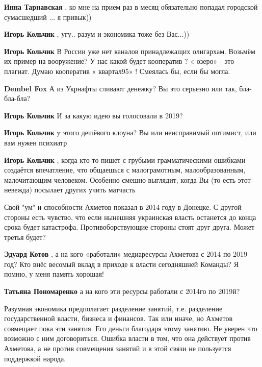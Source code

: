 \begin{itemize}
\begin{itemize}
\textbf{Инна Тарнавская} , ко мне на прием раз в месяц обязательно попадал городской сумасшедший ... я привык))

\textbf{Игорь Кольчик} , угу.. разум и экономика тоже без Вас...))

\textbf{Игорь Кольчик} В России уже нет каналов принадлежащих олигархам. Возьмём их пример на вооружение? У нас какой будет кооператив ? « озеро» - это плагиат. Думаю кооператив « квартал95» ! Смеялась бы, если бы могла.

\textbf{Dembel Fox} А из Укрнафты сливают денежку? Вы это серьезно или так, бла-бла-бла?

\textbf{Игорь Кольчик} И за какую идею вы голосовали в 2019?

\textbf{Игорь Кольчик} y этого дешёвого клоуна? Вы или неисправимый оптимист, или вам нужен психиатр

\textbf{Игорь Кольчик} , когда кто-то пишет с грубыми грамматическими ошибками создаётся впечатление, что общаешься с малограмотным, малообразованным, малочитающим человеком. Особенно смешно выглядит, когда Вы (то есть этот невежда) посылает других учить матчасть
\end{itemize} %


Свой "ум" и способности Ахметов показал в 2014 году в Донецке. С другой стороны
есть чувство, что если нынешняя украинская власть останется до конца срока
будет катастрофа. Противоборствующие стороны стоят друг друга. Может третья
будет?

\begin{itemize} %
\textbf{Эдуард Котов} , а на кого «работали» медиаресурсы Ахметова с 2014 по 2019 год? Кто внёс весомый вклад в приходе к власти сегодняшней Команды? Я помню, у меня память хорошая!

\textbf{Татьяна Пономаренко} а на кого эти ресурсы работали с 2014го по 2019й?
\end{itemize} %


Разумная экономика предполагает разделение занятий, т.е. разделение
государственной власти, бизнеса и финансов. Так или иначе, но Ахметов совмещает
пока эти занятия. Его деньги благодаря этому занятию. Не уверен что возможно с
ним договориться. Ошибка власти в том, что она действует против Ахметова, а не
против совмещения занятий и в этой связи не пользуется поддержкой народа.


\end{itemize}
